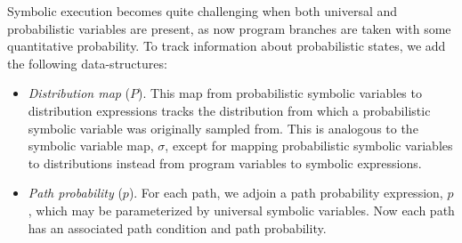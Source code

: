 \documentclass[acmsmall,review,anonymous]{acmart}\settopmatter{printfolios=true,printccs=false,printacmref=false}
\begin{document}
Symbolic execution becomes quite challenging when both universal and probabilistic variables are present, as now program branches are taken with some quantitative probability.
% 
To track information about probabilistic states, we add the following data-structures:
\begin{itemize}
\item \textit{Distribution map} ($P$). This map from probabilistic symbolic variables to distribution expressions tracks the distribution from which a probabilistic symbolic variable was originally sampled from.
	This is analogous to the symbolic variable map, $\sigma$, except for mapping probabilistic symbolic variables to distributions instead from program variables to symbolic expressions.
\item \textit{Path probability} ($p$). For each path, we adjoin a path probability expression, $p$, which may be parameterized by universal symbolic variables.
	Now each path has an associated path condition and path probability.
\end{itemize}
\end{document}
